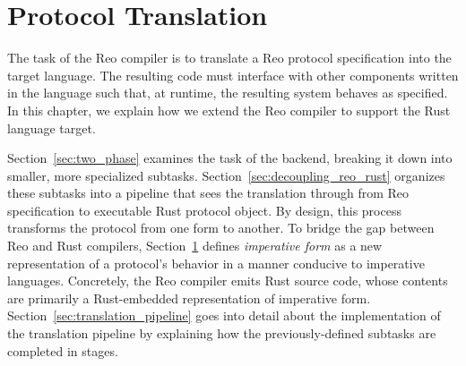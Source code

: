 \chapter{Protocol Translation}
\label{sec:imperative_form}

The task of the Reo compiler is to translate a Reo protocol specification into the target language. The resulting code must interface with other components written in the language such that, at runtime, the resulting system behaves as specified. In this chapter, we explain how we extend the Reo compiler to support the Rust language target.

Section~\ref{sec:two_phase} examines the task of the backend, breaking it down into smaller, more specialized subtasks. Section~\ref{sec:decoupling_reo_rust} organizes these subtasks into a pipeline that sees the translation through from Reo specification to executable Rust protocol object. By design, this process transforms the protocol from one form to another. To bridge the gap between Reo and Rust compilers, Section~\ref{sec:imperative_form} defines \textit{imperative form} as a new representation of a protocol's behavior in a manner conducive to imperative languages. Concretely, the Reo compiler emits Rust source code, whose contents are primarily a Rust-embedded representation of imperative form. Section~\ref{sec:translation_pipeline} goes into detail about the implementation of the translation pipeline by explaining how the previously-defined subtasks are completed in stages.


